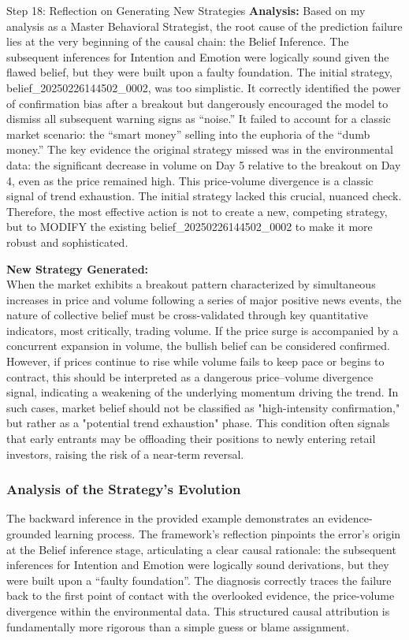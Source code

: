 \documentclass[letterpaper]{article} %
\begin{document}
\begin{backwardBox}{Step 18: Reflection on Generating New Strategies}
    \textbf{Analysis:} Based on my analysis as a Master Behavioral Strategist, the root cause of the prediction failure lies at the very beginning of the causal chain: the Belief Inference. The subsequent inferences for Intention and Emotion were logically sound given the flawed belief, but they were built upon a faulty foundation.
    The initial strategy, belief\_20250226144502\_0002, was too simplistic. It correctly identified the power of confirmation bias after a breakout but dangerously encouraged the model to dismiss all subsequent warning signs as ``noise.'' It failed to account for a classic market scenario: the ``smart money'' selling into the euphoria of the ``dumb money.''
    The key evidence the original strategy missed was in the environmental data: the significant decrease in volume on Day 5 relative to the breakout on Day 4, even as the price remained high. This price-volume divergence is a classic signal of trend exhaustion. The initial strategy lacked this crucial, nuanced check.
    Therefore, the most effective action is not to create a new, competing strategy, but to MODIFY the existing belief\_20250226144502\_0002 to make it more robust and sophisticated.
    
    \textbf{New Strategy Generated:} \\
    When the market exhibits a breakout pattern characterized by simultaneous increases in price and volume following a series of major positive news events, the nature of collective belief must be cross-validated through key quantitative indicators, most critically, trading volume. If the price surge is accompanied by a concurrent expansion in volume, the bullish belief can be considered confirmed. However, if prices continue to rise while volume fails to keep pace or begins to contract, this should be interpreted as a dangerous price–volume divergence signal, indicating a weakening of the underlying momentum driving the trend.
    In such cases, market belief should not be classified as "high-intensity confirmation," but rather as a "potential trend exhaustion" phase. This condition often signals that early entrants may be offloading their positions to newly entering retail investors, raising the risk of a near-term reversal.
\end{backwardBox}


\subsubsection{Analysis of the Strategy's Evolution}
The backward inference in the provided example demonstrates an evidence-grounded learning process. The framework's reflection pinpoints the error's origin at the Belief inference stage, articulating a clear causal rationale: the subsequent inferences for Intention and Emotion were logically sound derivations, but they were built upon a ``faulty foundation''. The diagnosis correctly traces the failure back to the first point of contact with the overlooked evidence, the price-volume divergence within the environmental data. This structured causal attribution is fundamentally more rigorous than a simple guess or blame assignment.
\end{document}
